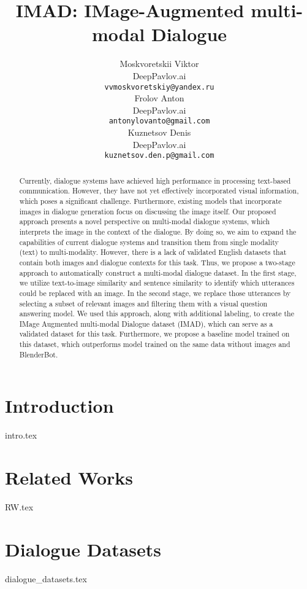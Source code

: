 \documentclass{article}
\title{IMAD: IMage-Augmented multi-modal Dialogue
}
\author{
  Moskvoretskii Viktor \\
  DeepPavlov.ai \\
  \texttt{vvmoskvoretskiy@yandex.ru} \\
   \And
  Frolov Anton \\
  DeepPavlov.ai \\
  \texttt{antonylovanto@gmail.com} \\
  \And
  Kuznetsov Denis \\
  DeepPavlov.ai \\
  \texttt{kuznetsov.den.p@gmail.com} \\

}
\begin{document}
\maketitle


\begin{abstract}
  Currently, dialogue systems have achieved high performance in processing text-based communication. However, they have not yet effectively incorporated visual information, which poses a significant challenge. Furthermore, existing models that incorporate images in dialogue generation focus on discussing the image itself. Our proposed approach presents a novel perspective on multi-modal dialogue systems, which interprets the image in the context of the dialogue. By doing so, we aim to expand the capabilities of current dialogue systems and transition them from single modality (text) to multi-modality. However, there is a lack of validated English datasets that contain both images and dialogue contexts for this task. Thus, we propose a two-stage approach to automatically construct a multi-modal dialogue dataset. In the first stage, we utilize text-to-image similarity and sentence similarity to identify which utterances could be replaced with an image. In the second stage, we replace those utterances by selecting a subset of relevant images and filtering them with a visual question answering model. We used this approach, along with additional labeling, to create the IMage Augmented multi-modal Dialogue dataset (IMAD), which can serve as a validated dataset for this task. Furthermore, we propose a baseline model trained on this dataset, which outperforms model trained on the same data without images and BlenderBot.
\end{abstract}




\section{Introduction}
{intro.tex}

\section{Related Works}
{RW.tex}

\section{Dialogue Datasets}
{dialogue_datasets.tex}
\end{document}
